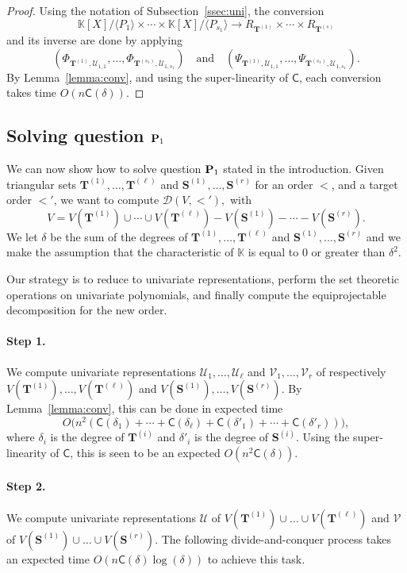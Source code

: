 \documentclass[12pt]{article}
\def\CC {\ensuremath{\mathsf{C}}}
\def\K {\ensuremath{\mathbb{K}}}
\def\Tt {\ensuremath{\mathbf{T}}}
\def\Ss {\ensuremath{\mathbf{S}}}
\def\Ur {\ensuremath{\mathscr U}}
\def\Vr {\ensuremath{\mathscr V}}
\def\Dr {\ensuremath{\mathscr D}}
\begin{document}
\begin{proof}
    Using the notation of Subsection~\ref{ssec:uni}, the conversion
    $$\K[X]/\langle P_1\rangle\times \cdots\times \K[X]/\langle
    P_{s_1}\rangle \to R_{\Tt^{(1)}} \times \cdots \times
    R_{\Tt^{(s)}}$$ and its inverse are done by applying
    $$(\Phi_{\Tt^{(1)},\Ur_{1,1}},\dots,\Phi_{\Tt^{(s_1)},\Ur_{1,{s_1}}})
    \quad\text{and}\quad
    (\Psi_{\Tt^{(1)},\Ur_{1,1}},\dots,\Psi_{\Tt^{(s_1)},\Ur_{1,{s_1}}}).$$
    By Lemma~\ref{lemma:conv}, and using the super-linearity of
    $\CC$, each conversion takes time $O(n\CC(\delta))$.
  \end{proof}



  \subsection{Solving question ${\bf P}_1$}\label{ssec:P1}

  We can now show how to solve question ${\bf P}_1$ stated in the
  introduction.  Given triangular sets $\Tt^{(1)},\dots,\Tt^{(\ell)}$
  and $\Ss^{(1)},\dots,\Ss^{(r)}$ for an order $<$, and a target order
  $<'$, we want to compute $\Dr (V, <'),$ with
$$V=
V(\Tt^{(1)}) \cup \cdots \cup V(\Tt^{(\ell)}) - V(\Ss^{(1)}) - \cdots
- V(\Ss^{(r)}).$$ We let $\delta$ be the sum of the degrees of
$\Tt^{(1)},\dots,\Tt^{(\ell)}$ and $\Ss^{(1)},\dots,\Ss^{(r)}$ and we
make the assumption that the characteristic of $\K$ is equal to $0$ or
greater than $\delta^2$.

Our strategy is to reduce to univariate representations, perform the
set theoretic operations on univariate polynomials, and finally
compute the equiprojectable decomposition for the new order.

\paragraph{Step 1.} We compute univariate representations
$\Ur_1,\dots,\Ur_\ell$ and $\Vr_1,\dots,\Vr_r$ of respectively
$V(\Tt^{(1)}),\dots,V(\Tt^{(\ell)})$ and
$V(\Ss^{(1)}),\dots,V(\Ss^{(r)})$. By Lemma~\ref{lemma:conv}, this can
be done in expected time
$$O\big (n^2(\CC(\delta_1) +\cdots + \CC(\delta_\ell)+ \CC(\delta'_1)
+\cdots + \CC(\delta'_r))\big ),$$ where $\delta_i$ is the degree of
$\Tt^{(i)}$ and $\delta'_i$ is the degree of $\Ss^{(i)}$.  Using the
super-linearity of $\CC$, this is seen to be an expected $O(n^2
\CC(\delta))$.

\paragraph{Step 2.} We compute univariate representations $\Ur$ of
$V(\Tt^{(1)}) \cup \dots \cup V(\Tt^{(\ell)})$ and $\Vr$ of
$V(\Ss^{(1)}) \cup \dots \cup V(\Ss^{(r)})$. The following
divide-and-conquer process takes an expected time
$O(n\CC(\delta)\log(\delta))$ to achieve this task.
\end{document}
